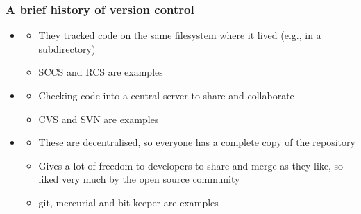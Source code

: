 \documentclass[hyperref={colorlinks=true}]{beamer}
\begin{document}
\begin{frame}%
  \frametitle{A brief history of version control}
  
  \begin{itemize}
    \item {}
    \begin{itemize}
      \item They tracked code on the same filesystem where it lived (e.g., in a subdirectory)
      \item SCCS and RCS are examples
    \end{itemize}
    \item {}
    \begin{itemize}
      \item Checking code into a central server to share and collaborate
      \item CVS and SVN are examples
    \end{itemize}
    \item  {}
    \begin{itemize}
      \item These are decentralised, so everyone has a complete copy of the repository
      \item Gives a lot of freedom to developers to share and merge as they like, so liked very much by the open source community
      \item git, mercurial and bit keeper are examples
    \end{itemize}
  \end{itemize}
  
\end{frame}

\end{document}

